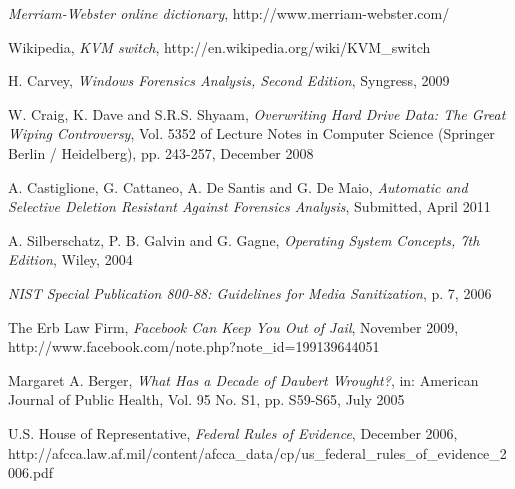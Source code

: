 \documentclass[runningheads]{llncs}
\begin{document}
\begin{thebibliography}{1}
\emph{Merriam-Webster online dictionary}, http://www.merriam-webster.com/

Wikipedia, \emph{KVM switch}, http://en.wikipedia.org/wiki/KVM\_switch

H. Carvey, \emph{Windows Forensics Analysis, Second Edition}, Syngress, 2009

W. Craig, K. Dave and S.R.S. Shyaam, \emph{Overwriting Hard Drive Data: The Great Wiping Controversy}, Vol. 5352 of Lecture Notes in Computer Science (Springer Berlin / Heidelberg), pp. 243-257, December 2008

A. Castiglione, G. Cattaneo, A. De Santis and G. De Maio, \emph{Automatic and Selective Deletion Resistant Against Forensics Analysis}, Submitted, April 2011

A. Silberschatz, P. B. Galvin and G. Gagne,
\emph{Operating System Concepts, 7th Edition}, Wiley, 2004

\emph{NIST Special Publication 800-88: Guidelines for Media Sanitization}, p. 7, 2006

The Erb Law Firm, \emph{Facebook Can Keep You Out of Jail}, November 2009,
http://www.facebook.com/note.php?note\_id=199139644051


Margaret A. Berger, \emph{What Has a Decade of Daubert Wrought?}, in: American Journal of Public Health, Vol. 95 No. S1, pp. S59-S65, July 2005

U.S. House of Representative, \emph{Federal Rules of Evidence}, December 2006,
http://afcca.law.af.mil/content/afcca\_data/cp/us\_federal\_rules\_of\_evidence\_2006.pdf

\end{thebibliography}


\end{document}
